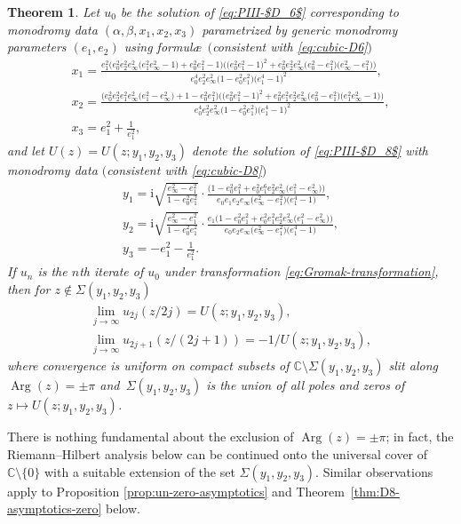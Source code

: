 \documentclass[11pt]{article}
\numberwithin{equation}{section}
\numberwithin{equation}{section}
\newtheorem{Theorem}{Theorem}[section]
\newcommand{\ii}{\mathrm{i}}
\newcommand{\C}{{\mathbb{C}}}
\renewcommand{\arg}{\operatorname{Arg}}
\begin{document}
\begin{Theorem}\label{thm:general}
 Let $u_0$ be the solution of \eqref{eq:PIII-$D_6$} corresponding to monodromy data $(\alpha, \beta, x_1, x_2, x_3)$ parametrized by generic monodromy parameters $(e_1,e_2)$ using formul\ae\ $($consistent with \eqref{eq:cubic-D6}$)$
 \begin{gather}%
 x_1=
 \frac{e_1^2 \big(e_0^2 e_2^2e_\infty^2 \big(e_1^2 e_\infty^2-1\big)+e_0^2 e_1^2-1\big)\big(\big(e_0^2 e_1^2-1\big)^2 + e_0^2e_2^2e_\infty^2 \big(e_0^2-e_1^2\big) \big(e_\infty^2-e_1^2\big)\big)}{e_0^4 e_2^2e_\infty^2\big(1-e_0^2 e_1^2\big)\big(e_1^4-1\big)^2 },\label{eq:x1}
\\
 x_2= \frac{\big(e_0^2 e_2^2 e_1^2e_\infty^2 \big(e_1^2-e_\infty^2\big)+1-e_0^2 e_1^2\big) \big(\big(e_0^2 e_1^2-1\big)^2\!+e_0^2 e_1^2e_2^2 e_\infty^2 \big(e_0^2-e_1^2\big) \big(e_1^2 e_\infty^2\!-1\big)\big)}{e_0^4e_2^2e_\infty^2 \big(1-e_0^2 e_1^2\big) \big(e_1^4-1\big)^2 }, \!\!\!\!
\\
 x_3=
 e_1^2+\frac{1}{e_1^2},\label{eq:x3}
\end{gather}
and let $U(z)=U(z;y_1,y_2,y_3)$ denote the solution of \eqref{eq:PIII-$D_8$} with monodromy data $($consistent with \eqref{eq:cubic-D8}$)$
 \begin{gather}
 y_1 = \ii\sqrt{\frac{e_\infty^2-e_1^2}{1-e_0^2 e_1^2}} \cdot\frac{ \big(1-e_0^2 e_1^2+e_0^2e_1^6e_2^2e_
 \infty^2\big(e_1^2-e_\infty^2\big)\big)}{e_0 e_1 e_2 e_\infty\big( e_\infty^2-e_1^2\big) \big(e_1^4-1\big) },
 \label{eq:y1}
\\
 y_2 = \ii\sqrt{\frac{e_\infty^2-e_1^2}{1-e_0^2 e_1^2}} \cdot\frac{e_1 \big(1-e_0^2 e_1^2+e_0^2e_1^2e_2^2e_
 \infty^2\big(e_1^2-e_\infty^2\big)\big)}{e_0e_2 e_\infty \big( e_\infty^2-e_1^2\big) \big(e_1^4-1\big)},
 \label{eq:y2}
 \\
 y_3 = -e_1^2-\frac{1}{e_1^2}.
 \label{eq:y3}
 \end{gather}
If $u_n$ is the $n$th iterate of $u_0$ under transformation \eqref{eq:Gromak-transformation}, then for $z\notin \Sigma(y_1,y_2,y_3)$
 \begin{gather*}
 \lim_{j \to \infty} u_{2j}(z/2j) = U(z;y_1,y_2,y_3),\\ \lim_{j \to \infty} u_{2j+1}(z/(2j+1)) = -1/U(z;y_1,y_2,y_3),
 \end{gather*}
where convergence is uniform on compact subsets of $\C\setminus \Sigma(y_1, y_2, y_3)$ slit along $\arg(z)= \pm \pi$ and~$\Sigma(y_1,y_2,y_3)$ is the union of all poles and zeros of $z\mapsto U(z;y_1,y_2,y_3)$.
\end{Theorem}
There is nothing fundamental about the exclusion of $\arg(z) = \pm \pi$; in fact, the Riemann--Hilbert analysis below can be continued onto the universal cover of $\C \setminus \{0\}$ with a suitable extension of the set $\Sigma(y_1, y_2, y_3)$. Similar observations apply to Proposition \ref{prop:un-zero-asymptotics} and Theorem~\ref{thm:D8-asymptotics-zero} below.
\end{document}
